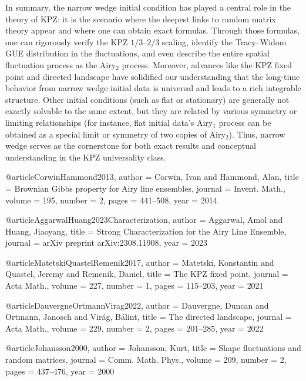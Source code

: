 \documentclass[letterpaper,11pt,oneside,reqno]{article}
\numberwithin{equation}{section}
\theoremstyle{definition}
\begin{document}
In summary, the narrow wedge initial condition has played a central role in the theory of KPZ: it is the scenario where the deepest links to random matrix theory appear and where one can obtain exact formulas. Through those formulas, one can rigorously verify the KPZ $1/3$–$2/3$ scaling, identify the Tracy–Widom GUE distribution in the fluctuations, and even describe the entire spatial fluctuation process as the Airy$_2$ process. Moreover, advances like the KPZ fixed point and directed landscape have solidified our understanding that the long-time behavior from narrow wedge initial data is universal and leads to a rich integrable structure. Other initial conditions (such as flat or stationary) are generally not exactly solvable to the same extent, but they are related by various symmetry or limiting relationships (for instance, flat initial data’s Airy$_1$ process can be obtained as a special limit or symmetry of two copies of Airy$_2$). Thus, narrow wedge serves as the cornerstone for both exact results and conceptual understanding in the KPZ universality class.

@article{CorwinHammond2013,
  author    = {Corwin, Ivan and Hammond, Alan},
  title     = {Brownian Gibbs property for Airy line ensembles},
  journal   = {Invent. Math.},
  volume    = {195},
  number    = {2},
  pages     = {441--508},
  year      = {2014}
}

@article{AggarwalHuang2023Characterization,
  author    = {Aggarwal, Amol and Huang, Jiaoyang},
  title     = {Strong Characterization for the Airy Line Ensemble},
  journal   = {arXiv preprint arXiv:2308.11908},
  year      = {2023}
}

@article{MatetskiQuastelRemenik2017,
  author    = {Matetski, Konstantin and Quastel, Jeremy and Remenik, Daniel},
  title     = {The {KPZ} fixed point},
  journal   = {Acta Math.},
  volume    = {227},
  number    = {1},
  pages     = {115--203},
  year      = {2021}
}

@article{DauvergneOrtmannVirag2022,
  author    = {Dauvergne, Duncan and Ortmann, Janosch and Vir{\'a}g, B{\'a}lint},
  title     = {The directed landscape},
  journal   = {Acta Math.},
  volume    = {229},
  number    = {2},
  pages     = {201--285},
  year      = {2022}
}

@article{Johansson2000,
  author    = {Johansson, Kurt},
  title     = {Shape fluctuations and random matrices},
  journal   = {Comm. Math. Phys.},
  volume    = {209},
  number    = {2},
  pages     = {437--476},
  year      = {2000}
}
\end{document}
